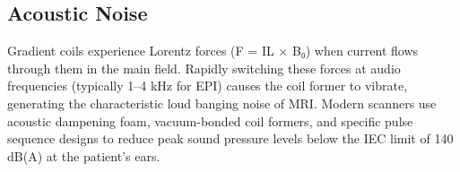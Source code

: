       

\subsection{Acoustic Noise}

      

Gradient coils experience Lorentz forces (F = IL × B₀) when current flows through them in the main field. Rapidly switching these forces at audio frequencies (typically 1–4 kHz for EPI) causes the coil former to vibrate, generating the characteristic loud banging noise of MRI. Modern scanners use acoustic dampening foam, vacuum-bonded coil formers, and specific pulse sequence designs to reduce peak sound pressure levels below the IEC limit of 140 dB(A) at the patient's ears.



